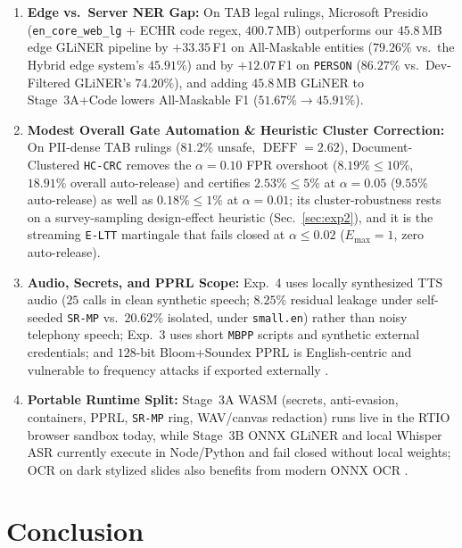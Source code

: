 \documentclass{article}
\begin{document}
\begin{enumerate}
    \item \textbf{Edge vs.\ Server NER Gap:} On TAB legal rulings, Microsoft Presidio (\texttt{en\_core\_web\_lg} + ECHR code regex, $400.7$\,MB) outperforms our $45.8$\,MB edge GLiNER pipeline by $+33.35$\,F1 on All-Maskable entities ($79.26\%$ vs.\ the Hybrid edge system's $45.91\%$) and by $+12.07$\,F1 on \texttt{PERSON} ($86.27\%$ vs.\ Dev-Filtered GLiNER's $74.20\%$), and adding $45.8$\,MB GLiNER to Stage~3A+Code lowers All-Maskable F1 ($51.67\% \to 45.91\%$).
    \item \textbf{Modest Overall Gate Automation \& Heuristic Cluster Correction:} On PII-dense TAB rulings ($81.2\%$ unsafe, $\operatorname{DEFF}{=}2.62$), Document-Clustered \texttt{HC-CRC} removes the $\alpha{=}0.10$ FPR overshoot ($8.19\% \le 10\%$, $18.91\%$ overall auto-release) and certifies $2.53\% \le 5\%$ at $\alpha{=}0.05$ ($9.55\%$ auto-release) as well as $0.18\% \le 1\%$ at $\alpha{=}0.01$; its cluster-robustness rests on a survey-sampling design-effect heuristic (Sec.~\ref{sec:exp2}), and it is the streaming \texttt{E-LTT} martingale that fails closed at $\alpha \le 0.02$ ($E_{\max}{=}1$, zero auto-release).
    \item \textbf{Audio, Secrets, and PPRL Scope:} Exp.~4 uses locally synthesized TTS audio ($25$ calls in clean synthetic speech; $8.25\%$ residual leakage under self-seeded \texttt{SR-MP} vs.\ $20.62\%$ isolated, under \texttt{small.en}) rather than noisy telephony speech; Exp.~3 uses short \texttt{MBPP} scripts and synthetic external credentials; and $128$-bit Bloom+Soundex PPRL is English-centric and vulnerable to frequency attacks if exported externally \citep{christen2018bloomattack}.
    \item \textbf{Portable Runtime Split:} Stage~3A WASM (secrets, anti-evasion, containers, PPRL, \texttt{SR-MP} ring, WAV/canvas redaction) runs live in the RTIO browser sandbox today, while Stage~3B ONNX GLiNER and local Whisper ASR currently execute in Node/Python and fail closed without local weights; OCR on dark stylized slides also benefits from modern ONNX OCR \citep{cui2025paddleocr,ibm2025granitedocling}.
\end{enumerate}

\section{Conclusion}
\label{sec:conclusion}
\end{document}
